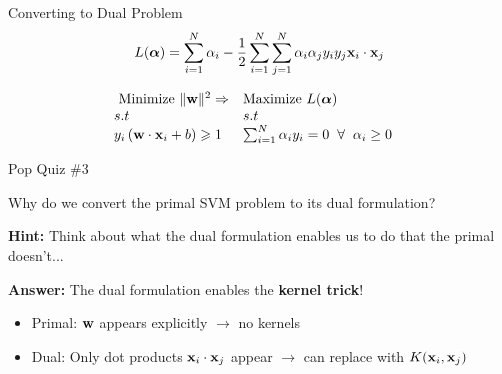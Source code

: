 \documentclass{beamer}
\begin{document}
\begin{frame}{Converting to Dual Problem}
\begin{align*}
&L(\boldsymbol{\alpha})=\sum_{i=1}^{N} \alpha_{i}-\frac{1}{2} \sum_{i=1}^{N} \sum_{j=1}^{N} \alpha_{i} \alpha_{j} y_{i} y_{j} \mathbf{x}_{i} \cdot \mathbf{x}_{j}\\
\end{align*}
\begin{tcolorbox}
\begin{align*}
&\begin{array}{ll}
{\text { Minimize }\|\mathbf{w}\|^{2} \Rightarrow}&{\text{Maximize } L(\boldsymbol{\alpha})} \\
{  s.t  } & {  s.t  } \\
{y_{i}\left(\mathbf{w} \cdot \mathbf{x}_{i}+b\right) \geqslant 1} & {\sum_{i=1}^{N} \alpha_{i} y_{i}=0 \hspace{2mm}\forall \hspace{2mm} \alpha_{i}  \geq 0}
\end{array}
\end{align*}
\end{tcolorbox}
\end{frame}

\begin{frame}{Pop Quiz \#3}
\begin{tcolorbox}[colback=blue!5!white,colframe=blue!75!black,title=Lagrangian Mystery!]
Why do we convert the primal SVM problem to its dual formulation?

\pause
\textbf{Hint:} Think about what the dual formulation enables us to do that the primal doesn't...

\pause
\textbf{Answer:} The dual formulation enables the \textbf{kernel trick}! 
\begin{itemize}
	\item Primal: $\mathbf{w}$ appears explicitly $\rightarrow$ no kernels
	\item Dual: Only dot products $\mathbf{x}_i \cdot \mathbf{x}_j$ appear $\rightarrow$ can replace with $K(\mathbf{x}_i, \mathbf{x}_j)$
\end{itemize}
\end{tcolorbox}
\end{frame}
\end{document}
